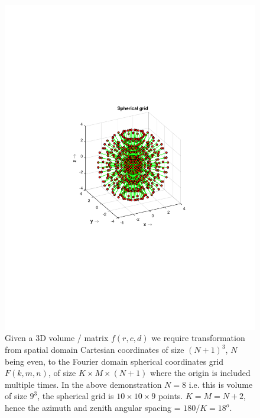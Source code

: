 \documentclass{UCF_ETD}
\begin{document}
\begin{figure}[H]
\begin{center}
\includegraphics[scale=0.8]{RobustRegistration/SphericalGrid}
\caption{Given a $3$D volume / matrix $f(r,c,d)$ we require transformation from spatial domain Cartesian coordinates of size $(N+1)^3$, $N$ being even, to the Fourier domain spherical coordinates grid $F(k,m,n)$, of size $K \times M \times (N+1)$ where the origin is included multiple times. In the above demonstration $N = 8$ i.e. this is volume of size $9^3$, the spherical grid is $10\times 10 \times 9$ points. $K = M = N+2$, hence the azimuth and zenith angular spacing = $180/K = 18^o$. }
\label{SphericalPolarTransformationRobust}
\end{center}
\end{figure}
\end{document}

